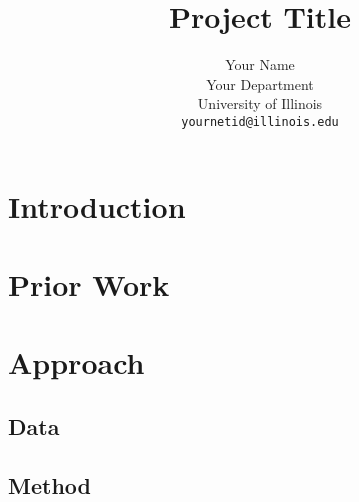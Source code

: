 \documentclass[11pt,a4paper]{article}
\title{Project Title}
\author{Your Name \\
  Your Department \\
  University of Illinois \\
  \texttt{yournetid@illinois.edu}}
\date{}
\begin{document}
\maketitle
\begin{abstract}
\lipsum[1] %
\end{abstract}

\section{Introduction}

\lipsum[2-5] \lipsum[66] %


\section{Prior Work}

\lipsum[6-20] \lipsum[17]  %


\section{Approach}

\lipsum[21]

\subsection{Data}
\lipsum[22-24]

\subsection{Method}
\lipsum[25-28]


\nocite{Europarl} %



\end{document}

